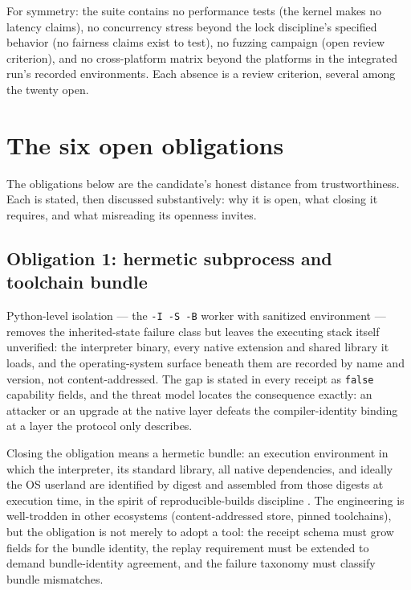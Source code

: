 \begin{remark}\label{evid:rem:notexercised}
For symmetry: the suite contains no performance tests (the kernel makes no latency claims), no concurrency stress beyond the lock discipline's specified behavior (no fairness claims exist to test), no fuzzing campaign (open review criterion), and no cross-platform matrix beyond the platforms in the integrated run's recorded environments. Each absence is a review criterion, several among the twenty open.
\end{remark}

\section{The six open obligations}\label{evid:obligations}

The obligations below are the candidate's honest distance from trustworthiness. Each is stated, then discussed substantively: why it is open, what closing it requires, and what misreading its openness invites.

\subsection{Obligation 1: hermetic subprocess and toolchain bundle}\label{evid:ob:hermetic}

Python-level isolation --- the \texttt{-I -S -B} worker with sanitized environment --- removes the inherited-state failure class but leaves the executing stack itself unverified: the interpreter binary, every native extension and shared library it loads, and the operating-system surface beneath them are recorded by name and version, not content-addressed. The gap is stated in every receipt as \texttt{false} capability fields, and the threat model locates the consequence exactly: an attacker or an upgrade at the native layer defeats the compiler-identity binding at a layer the protocol only describes.

Closing the obligation means a hermetic bundle: an execution environment in which the interpreter, its standard library, all native dependencies, and ideally the OS userland are identified by digest and assembled from those digests at execution time, in the spirit of reproducible-builds discipline \cite{reprobuilds}. The engineering is well-trodden in other ecosystems (content-addressed store, pinned toolchains), but the obligation is not merely to adopt a tool: the receipt schema must grow fields for the bundle identity, the replay requirement must be extended to demand bundle-identity agreement, and the failure taxonomy must classify bundle mismatches.

